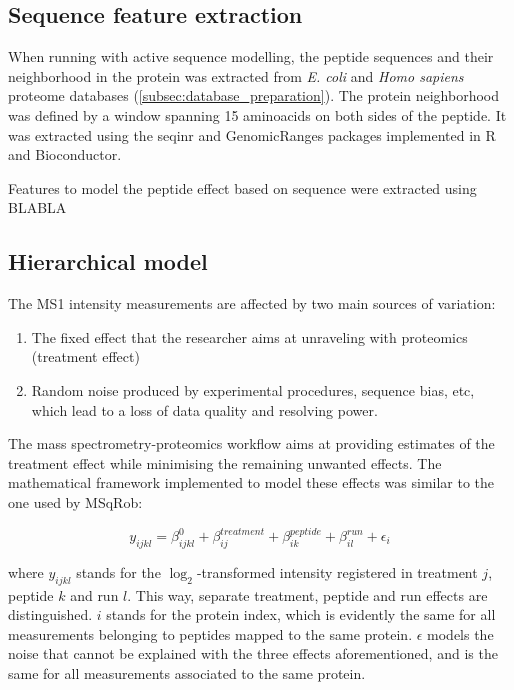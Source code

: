 \subsection{Sequence feature extraction}

When running with active sequence modelling, the peptide sequences and their neighborhood in the protein was extracted from \textit{E. coli} and \textit{Homo sapiens} proteome databases (\ref{subsec:database_preparation}). The protein neighborhood was defined by a window spanning 15 aminoacids on both sides of the peptide. It was extracted using the seqinr \cite{Charif2007} and GenomicRanges \cite{Lawrence2013} packages implemented in R and Bioconductor.

Features to model the peptide effect based on sequence were extracted using BLABLA

\subsection{Hierarchical model}

The \ac{MS1} intensity measurements are affected by two main sources of variation:

\begin{enumerate}
\item The fixed effect that the researcher aims at unraveling with proteomics (treatment effect)
\item Random noise produced by experimental procedures, sequence bias, etc, which lead to a loss of data quality and resolving power.
\end{enumerate}


The mass spectrometry-proteomics workflow aims at providing estimates of the treatment effect while minimising the remaining unwanted effects. The mathematical framework implemented to model these effects was similar to the one used by MSqRob:

\begin{equation}\label{eq:model}
y_{ijkl} = \beta_{ijkl}^{0} + \beta_{ij}^{treatment} + \beta_{ik}^{peptide} + \beta_{il}^{run} + \epsilon_{i}
\end{equation}

where $y_{ijkl}$ stands for the $\log_2$-transformed intensity registered in treatment $j$, peptide $k$ and run $l$. This way, separate treatment, peptide and run effects are distinguished. $i$ stands for the protein index, which is evidently the same for all measurements belonging to peptides mapped to the same protein. $\epsilon$ models the noise that cannot be explained with the three effects aforementioned, and is the same for all measurements associated to the same protein.

